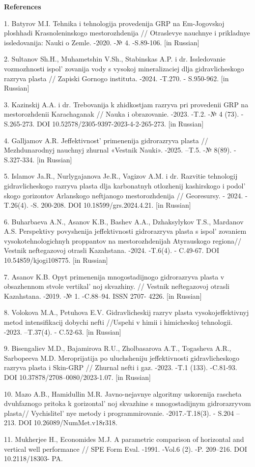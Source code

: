 \begin{center}
{\bfseries References}
\end{center}

\begin{refs}
1. Batyrov M.I. Tehnika i tehnologija provedenija GRP na Em-Jogovskoj
ploshhadi Krasnoleninskogo mestorozhdenija // Otraslevye nauchnye i
prikladnye issledovanija: Nauki o Zemle. -2020. -№ 4. -S.89-106. {[}in
Russian{]}

2. Sultanov Sh.H., Muhametshin V.Sh., Stabinskas A.P. i dr. Issledovanie
vozmozhnosti ispol' zovanija vody s vysokoj
mineralizaciej dlja gidravlicheskogo razryva plasta // Zapiski Gornogo
instituta. -2024. -T.270. - S.950-962. {[}in Russian{]}

3. Kazinskij A.A. i dr. Trebovanija k zhidkostjam razryva pri provedenii
GRP na mestorozhdenii Karachaganak // Nauka i obrazovanie. -2023. -T.2.
-№ 4 (73). -S.265-273. DOI 10.52578/2305-9397-2023-4-2-265-273. {[}in
Russian{]}

4. Galljamov A.R. Jeffektivnost'{} primenenija
gidrorazryva plasta // Mezhdunarodnyj nauchnyj zhurnal «Vestnik Nauki».
-2025. --T.5. -№ 8(89). -S.327-334. {[}in Russian{]}

5. Islamov Ja.R., Nurlygajanova Je.R., Vagizov A.M. i dr. Razvitie
tehnologij gidravlicheskogo razryva plasta dlja karbonatnyh otlozhenij
kashirskogo i podol' skogo gorizontov Arlanskogo
neftjanogo mestorozhdenija // Georesursy. - 2024. -T.26(4). -S.
200-208. DOI 10.18599/grs.2024.4.21. {[}in Russian{]}

6. Buharbaeva A.N., Asanov K.B., Bashev A.A., Dzhaksylykov T.S.,
Mardanov A.S. Perspektivy povyshenija jeffektivnosti gidrorazryva plasta
s ispol' zovaniem vysokotehnologichnyh proppantov na
mestorozhdenijah Atyrauskogo regiona// Vestnik neftegazovoj otrasli
Kazahstana. -2024. -T.6(4). - C.49-67. DOI 10.54859/kjogi108775. {[}in
Russian{]}

7. Asanov K.B. Opyt primenenija mnogostadijnogo gidrorazryva plasta v
obsazhennom stvole vertikal' noj skvazhiny. // Vestnik
neftegazovoj otrasli Kazahstana. -2019. -№ 1. -C.88--94. ISSN 2707-
4226. {[}in Russian{]}

8. Volokova M.A., Petuhova E.V. Gidravlicheskij razryv plasta
vysokojeffektivnyj metod intensifikacij dobychi nefti //Uspehi v himii i
himicheskoj tehnologii. -2023. --T.37(4). - C.52-63. {[}in Russian{]}

9. Bisengaliev M.D., Bajamirova R.U., Zholbasarova A.T., Togasheva A.R.,
Sarbopeeva M.D. Meroprijatija po uluchsheniju jeffektivnosti
gidravlicheskogo razryva plasta i Skin-GRP // Zhurnal nefti i gaz.
-2023. -T.1 (133). -C.81-93. DOI 10.37878/2708--0080/2023-1.07. {[}in
Russian{]}

10. Mazo A.B., Hamidullin M.R. Javno-nejavnye algoritmy uskorenija
rascheta dvuhfaznogo pritoka k gorizontal' noj skvazhine
s mnogostadijnym gidrorazryvom plasta// Vychislitel' nye
metody i programmirovanie. -2017.-T.18(3). - S.204 -- 213. DOI
10.26089/NumMet.v18r318.

11. Mukherjee H., Economides M.J. A parametric comparison of horizontal
and vertical well performance // SPE Form Eval. -1991. -Vol.6 (2). -P.
209--216. DOI 10.2118/18303- PA.
\end{refs}

